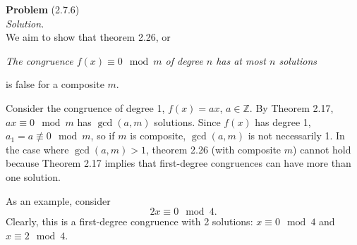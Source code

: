 \documentclass[12 pt]{amsart}
\begin{document}
\phantom{\quad} \vfill
\noindent
\textbf{Problem} (2.7.6) \\[4ex]
\emph{Solution.} \\[2ex]
  We aim to show that
  theorem 2.26, or
  \begin{center}
    \emph{The congruence $f(x) \equiv 0 \mod m$ of degree $n$
          has at most $n$ solutions}
  \end{center}
  is false for a composite $m$.

  Consider the congruence of degree 1, 
  $f(x) = a x$, $a \in \mathbb{Z}$.
  By Theorem 2.17, $ax \equiv 0 \mod m$ has 
  $\gcd(a, m)$ solutions. 
  Since $f(x)$ has degree 1, 
  $a_1 = a \not \equiv 0 \mod m$, 
  so if
  $m$ is composite, $\gcd(a, m)$ is not necessarily 1.
  In the case where $\gcd(a, m) > 1$, theorem 2.26 
  (with composite $m$)
  cannot hold
  because Theorem 2.17 implies that first-degree congruences 
  can have more than one solution.

  As an example, consider
  \[
    2x \equiv 0 \mod 4.
  \]
  Clearly, this is a first-degree congruence with 2 solutions:
  $x \equiv 0 \mod 4$ and $x \equiv 2 \mod 4$. 
\vfill
\newpage
\end{document}
